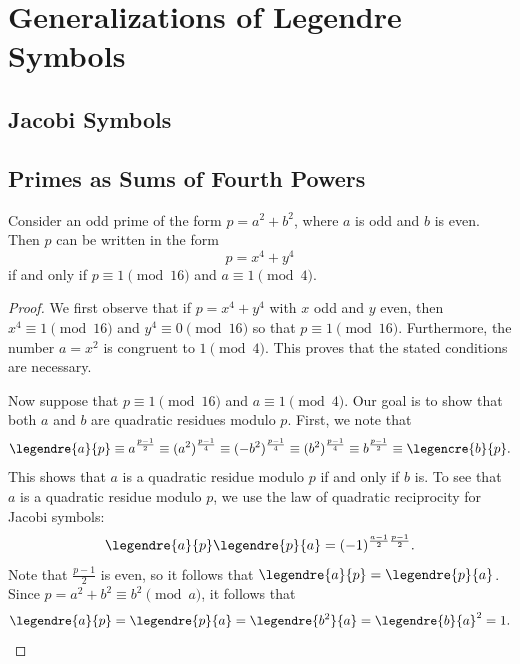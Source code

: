 \chapter{Generalizations of Legendre Symbols}

\section{Jacobi Symbols}

\section{Primes as Sums of Fourth Powers}

\begin{theorem}
  Consider an odd prime of the form $p=a^2+b^2$, where $a$ is odd and $b$ is even. Then $p$ can be written in the form
  \begin{equation*}
    p=x^4+y^4
  \end{equation*}
  if and only if $p\equiv 1\pmod{16}$ and $a\equiv 1\pmod{4}$.
\end{theorem}

\begin{proof}
  We first observe that if $p=x^4+y^4$ with $x$ odd and $y$ even, then $x^4\equiv 1\pmod{16}$ and $y^4\equiv 0\pmod{16}$ so that $p\equiv 1\pmod{16}$. Furthermore, the number $a=x^2$ is congruent to $1\pmod{4}$. This proves that the stated conditions are necessary.

  Now suppose that $p\equiv 1\pmod{16}$ and $a\equiv 1\pmod{4}$. Our goal is to show that both $a$ and $b$ are quadratic residues modulo $p$. First, we note that
  \begin{equation*}
    \legendre{a}{p}\equiv a^{\frac{p-1}{2}}\equiv (a^2)^{\frac{p-1}{4}} \equiv (-b^2)^{\frac{p-1}{4}} \equiv (b^2)^{\frac{p-1}{4}}\equiv b^{\frac{p-1}{2}}\equiv \legencre{b}{p}.
  \end{equation*}
  This shows that $a$ is a quadratic residue modulo $p$ if and only if $b$ is. To see that $a$ is a quadratic residue modulo $p$, we use the law of quadratic reciprocity for Jacobi symbols:
  \begin{equation*}
    \legendre{a}{p}\legendre{p}{a}=(-1)^{\frac{a-1}{2}\frac{p-1}{2}}.
  \end{equation*}
  Note that $\frac{p-1}{2}$ is even, so it follows that $\legendre{a}{p}=\legendre{p}{a}$. Since $p=a^2+b^2\equiv b^2\pmod{a}$, it follows that
  \begin{equation*}
    \legendre{a}{p}=\legendre{p}{a}=\legendre{b^2}{a}=\legendre{b}{a}^2=1.\qedhere
  \end{equation*}
\end{proof}
